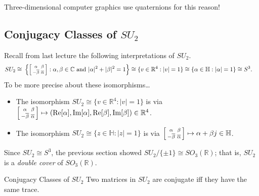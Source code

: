 Three-dimensional computer graphics use quaternions for this reason!

\subsection{Conjugacy Classes of $SU_2$}

Recall from last lecture the following interpretations of $SU_2$.
\begin{align*}
SU_2 \cong \ & \left \{ \begin{bsmallmatrix} \alpha & \beta \\ - \overline{\beta} & \overline{\alpha} \end{bsmallmatrix} : \alpha, \beta \in \mathbb{C} \text{ and } |\alpha|^2 + |\beta|^2 = 1\right \} \cong  \{v \in \mathbb{R}^4: |v| = 1 \} \cong \{ \alpha \in \mathbb{H} : |\alpha| = 1 \}\cong S^3. 
\end{align*}
To be more precise about these isomorphisms\dots
\begin{itemize}
    \item The isomorphism $SU_2 \cong \{v \in \mathbb{R}^4 : |v| = 1\}$ is via $\begin{bsmallmatrix} \alpha & \beta \\ -\overline{\beta} & \overline{\alpha} \end{bsmallmatrix} \mapsto (\mathrm{Re}[\alpha], \mathrm{Im}[\alpha], \mathrm{Re}[\beta], \mathrm{Im}[\beta]) \in \mathbb{R}^4$.
    \item The isomorphism $SU_2 \cong \{ z \in \mathbb{H} : |z| = 1\}$ is via $\begin{bsmallmatrix} \alpha & \beta \\ -\overline{\beta} & \overline{\alpha} \end{bsmallmatrix} \mapsto \alpha + \beta j \in \mathbb{H}$.
\end{itemize}
Since $SU_2 \cong S^3$, the previous section showed $SU_2 / \{\pm 1\} \cong SO_3(\mathbb{R})$; that is, $SU_2$ is a \emph{double cover} of $SO_3(\mathbb{R})$.

\begin{theorem}{Conjugacy Classes of $SU_2$}
    Two matrices in $SU_2$ are conjugate iff they have the same trace.
\end{theorem}

